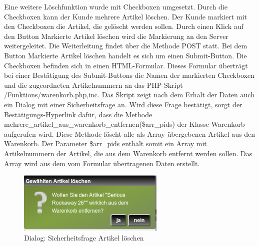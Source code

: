 Eine weitere Löschfunktion wurde mit Checkboxen umgesetzt. Durch die Checkboxen kann der Kunde mehrere Artikel löschen. Der Kunde markiert mit den Checkboxen die Artikel, die gelöscht werden sollen. Durch einen Klick auf den Button \glqq Markierte Artikel löschen\grqq{} wird die Markierung an den Server weitergeleitet. Die Weiterleitung findet über die Methode \glqq POST\grqq{} statt. Bei dem Button \glqq Markierte Artikel löschen\grqq{} handelt es sich um einen Submit-Button. Die Checkboxen befinden sich in einen HTML-Formular. Dieses Formular überträgt bei einer Bestätigung des Submit-Buttons die Namen  der markierten Checkboxen und die zugeordneten Artikelnummern an das PHP-Skript \glqq /Funktions/warenkorb.php,inc\grqq{}. Das Skript zeigt nach dem Erhalt der Daten auch ein Dialog mit einer Sicherheitsfrage an. Wird diese Frage bestätigt, sorgt der Bestätigungs-Hyperlink dafür, dass die Methode \glqq mehrere\_artikel\_aus\_warenkorb\_entfernen(\$arr\_pids)\grqq{} der Klasse \glqq Warenkorb\grqq{} aufgerufen wird. Diese Methode löscht alle als Array übergebenen Artikel aus den Warenkorb. Der Parameter \glqq \$arr\_pids\grqq{} enthält somit ein Array mit Artikelnummern der Artikel, die aus dem Warenkorb entfernt werden sollen. Das Array wird aus dem vom Formular übertragenen Daten erstellt.

\begin{figure}[H]
	\begin{center}
			\includegraphics[width=70mm]{Bilder/sicherheitsfrage_artikel_loeschen.png}
	\end{center}
	\caption{Dialog: Sicherheitsfrage Artikel löschen}
\end{figure}

